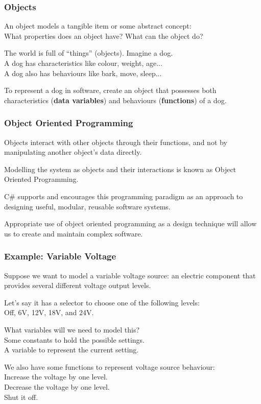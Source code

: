 \begin{frame}
\frametitle{Objects}



An object models a tangible item or some abstract concept:\\
\quad What properties does an object have? What can the object do?

The world is full of ``things'' (objects). Imagine a dog.\\
\quad A dog has characteristics like colour, weight, age...\\
\quad A dog also has behaviours like bark, move, sleep...

To represent a dog in software, create an object that possesses both characteristics (\textbf{data variables}) and behaviours (\textbf{functions}) of a dog.


\end{frame}

\begin{frame}
\frametitle{Object Oriented Programming}

Objects interact with other objects through their functions, and not by manipulating another object's data directly.

Modelling the system as objects and their interactions is known as \alert{Object Oriented Programming}.

C\# supports and encourages this programming paradigm as an approach to designing useful, modular, reusable software systems.

Appropriate use of object oriented programming as a design technique will allow us to create and maintain complex software.

\end{frame}

\begin{frame}
\frametitle{Example: Variable Voltage}
Suppose we want to model a variable voltage source: an electric component that provides several different voltage output levels. 

Let's say it has a selector to choose one of the following levels:\\
\quad Off, 6V, 12V, 18V, and 24V.

What variables will we need to model this?\\
\quad Some constants to hold the possible settings.\\
\quad A variable to represent the current setting.

We also have some functions to represent voltage source behaviour:\\
\quad Increase the voltage by one level.\\
\quad Decrease the voltage by one level.\\
\quad Shut it off.\\


\end{frame}


